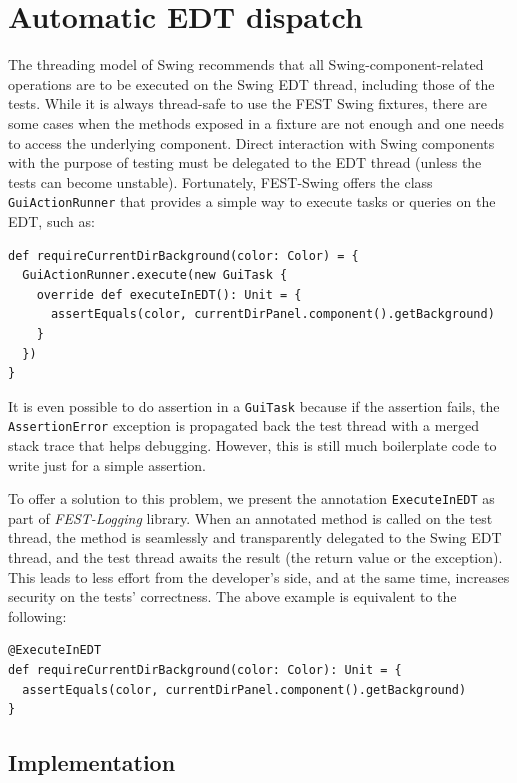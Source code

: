 \section{Automatic EDT dispatch}\label{sec:edt-dispatch}

The threading model of Swing recommends that all Swing-component-related operations are to be executed on the Swing EDT thread, including those of the tests. While it is always thread-safe to use the FEST Swing fixtures, there are some cases when the methods exposed in a fixture are not enough and one needs to access the underlying component. Direct interaction with Swing components with the purpose of testing must be delegated to the EDT thread (unless the tests can become unstable). Fortunately, FEST-Swing offers the class \texttt{GuiActionRunner} that provides a simple way to execute tasks or queries on the EDT, such as:
\begin{lstlisting}
def requireCurrentDirBackground(color: Color) = {
  GuiActionRunner.execute(new GuiTask {
    override def executeInEDT(): Unit = {
      assertEquals(color, currentDirPanel.component().getBackground)
    }
  })
}
\end{lstlisting}
It is even possible to do assertion in a \texttt{GuiTask} because if the assertion fails, the \texttt{Assertion\-Error} exception is propagated back the test thread with a merged stack trace that helps debugging. However, this is still much boilerplate code to write just for a simple assertion.

To offer a solution to this problem, we present the annotation \texttt{ExecuteInEDT} as part of \emph{FEST-Logging} library. When an annotated method is called on the test thread, the method is seamlessly and transparently delegated to the Swing EDT thread, and the test thread awaits the result (the return value or the exception). This leads to less effort from the developer's side, and at the same time, increases security on the tests' correctness. The above example is equivalent to the following:
\begin{lstlisting}
@ExecuteInEDT
def requireCurrentDirBackground(color: Color): Unit = {
  assertEquals(color, currentDirPanel.component().getBackground)
}
\end{lstlisting}

\subsection{Implementation}\label{sec:edt-dispatch-impl}

